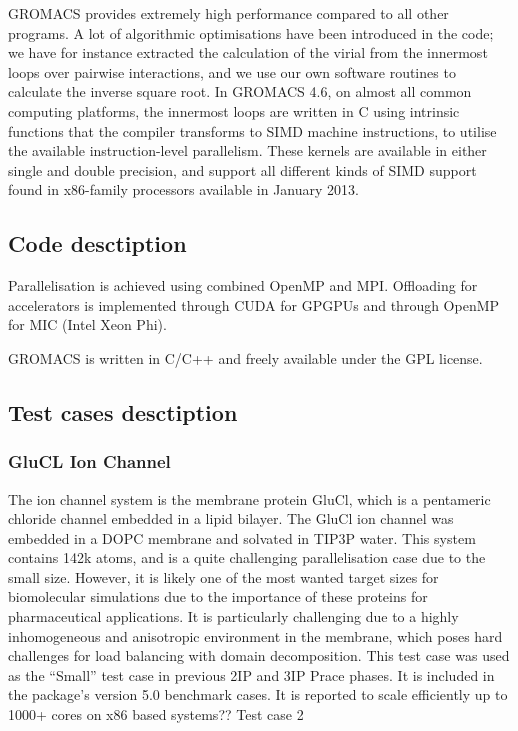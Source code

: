 GROMACS provides extremely high performance compared to all other programs. A lot of algorithmic optimisations have been introduced in the code; we have for instance extracted the calculation of the virial from the innermost loops over pairwise interactions, and we use our own software routines to calculate the inverse square root. In GROMACS 4.6, on almost all common computing platforms, the innermost loops are written in C using intrinsic functions that the compiler transforms to SIMD machine instructions, to utilise the available instruction-level parallelism. These kernels are available in either single and double precision, and support all different kinds of SIMD support found in x86-family processors available in January 2013.

\subsection{Code desctiption}
Parallelisation is achieved using combined OpenMP and MPI.
Offloading for accelerators is implemented through CUDA for GPGPUs and through OpenMP for MIC (Intel Xeon Phi).

GROMACS is written in C/C++ and freely available under the GPL license.

\subsection{Test cases desctiption}

\subsubsection{GluCL Ion Channel}
The ion channel system is the membrane protein GluCl, which is a pentameric chloride channel embedded in a lipid bilayer. The GluCl ion channel was embedded in a DOPC membrane and solvated in TIP3P water. This system contains 142k atoms, and is a quite challenging parallelisation case due to the small size. However, it is likely one of the most wanted target sizes for biomolecular simulations due to the importance of these proteins for pharmaceutical applications. It is particularly challenging due to a highly inhomogeneous and anisotropic environment in the membrane, which poses hard challenges for load balancing with domain decomposition.
This test case was used as the “Small” test case in previous 2IP and 3IP Prace phases. It is included in the package's version 5.0 benchmark cases. It is reported to scale efficiently up to 1000+ cores on x86 based systems??
Test case 2

